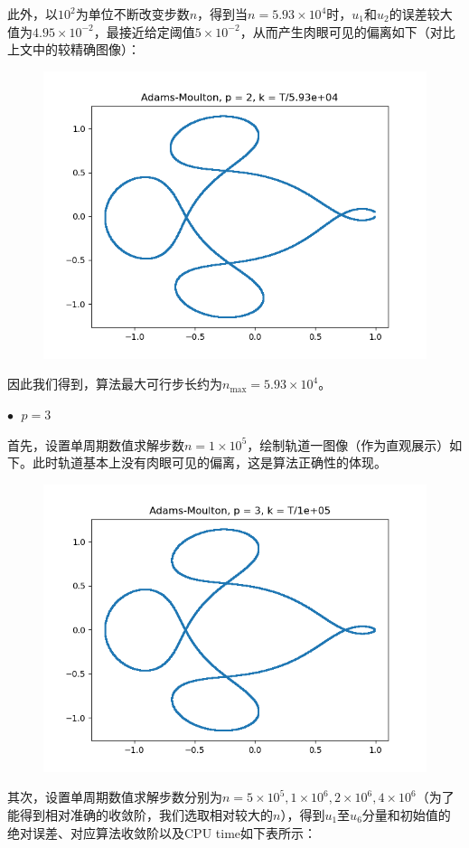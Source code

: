 \documentclass{ctexart}
\begin{document}
\begin{sloppypar}
此外，以$10^2$为单位不断改变步数$n$，得到当$n = 5.93 \times 10^4$时，$u_1$和$u_2$的误差较大值为$4.95 \times 10^{-2}$，最接近给定阈值$5 \times 10^{-2}$，从而产生肉眼可见的偏离如下（对比上文中的较精确图像）：
\begin{figure}[H]
\centering
\includegraphics[scale = 0.45]{./report_src/Figure_10.png}
\end{figure}
因此我们得到，算法最大可行步长约为$n_{\max} = 5.93 \times 10^4$。

$\bullet \;$ $p = 3$

首先，设置单周期数值求解步数$n = 1 \times 10^5$，绘制轨道一图像（作为直观展示）如下。此时轨道基本上没有肉眼可见的偏离，这是算法正确性的体现。
\begin{figure}[H]
\centering
\includegraphics[scale = 0.45]{./report_src/Figure_11.png}
\end{figure}
其次，设置单周期数值求解步数分别为$n = 5 \times 10^5,1 \times 10^6,2 \times 10^6, 4 \times 10^6$（为了能得到相对准确的收敛阶，我们选取相对较大的$n$），得到$u_1$至$u_6$分量和初始值的绝对误差、对应算法收敛阶以及CPU time如下表所示：


\end{sloppypar}
\end{document}
